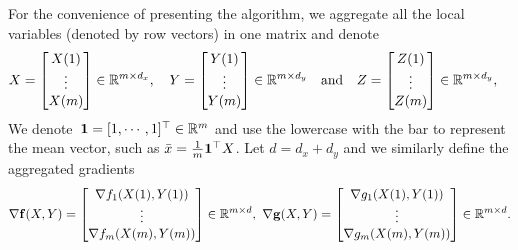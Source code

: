 For the convenience of presenting the algorithm, we aggregate all the local variables (denoted by row vectors) in one matrix and denote
\begin{align*}
X=\begin{bmatrix}
X(1) \\ \vdots \\ X(m)
\end{bmatrix}&\in{\mathbb{R}}^{m\times d_x},
\quad
Y=\begin{bmatrix}
Y(1) \\ \vdots \\ Y(m)
\end{bmatrix}\in{\mathbb{R}}^{m\times d_y}
\quad \text{and} \quad
Z=\begin{bmatrix}
Z(1) \\ \vdots \\ Z(m)
\end{bmatrix}\in{\mathbb{R}}^{m\times d_y},
\end{align*}
We denote~${\bf{1}} = [1,\cdots,1]^\top \in {\mathbb{R}}^m$ and use the lowercase with the bar to represent the mean vector, such as $\bar x = \frac{1}{m} {\bf{1}}^\top X$.
Let $d = d_x+d_y$ and we similarly define the aggregated gradients 
{\small \begin{align*}
\nabla {\bf{f}}(X,Y)=\begin{bmatrix}
\nabla f_1(X(1),Y(1)) \\ \vdots \\ \nabla f_m(X(m),Y(m))
\end{bmatrix}
\in{\mathbb{R}}^{m\times d}, ~\nabla {\bf{g}}(X,Y)=\begin{bmatrix}
\nabla g_1(X(1),Y(1)) \\ \vdots \\ \nabla g_m(X(m),Y(m))
\end{bmatrix}
\in{\mathbb{R}}^{m\times d}.    
\end{align*}}



